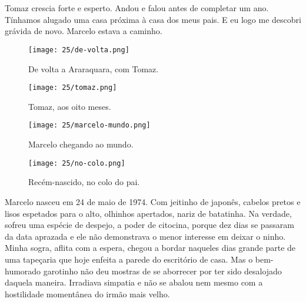 \chapter{}

Tomaz crescia forte e esperto.
Andou e falou antes de completar um ano.
Tínhamos alugado uma casa próxima à casa dos meus pais.
E eu logo me descobri grávida de novo.
Marcelo estava a caminho.
  

\begin{figure}
\centering
\texttt{[image: 25/de-volta.png]}
\caption{De volta a Araraquara, com Tomaz.}
\end{figure}

\begin{figure}
\centering
\texttt{[image: 25/tomaz.png]}
\caption{Tomaz, aos oito meses.}
\end{figure}

\begin{figure}
\centering
\texttt{[image: 25/marcelo-mundo.png]}
\caption{Marcelo chegando ao mundo.}
\end{figure}

\begin{figure}
\centering
\texttt{[image: 25/no-colo.png]}
\caption{Recém-nascido, no colo do pai.}
\end{figure}

Marcelo nasceu em 24 de maio de 1974.
Com jeitinho de japonês, cabelos pretos e lisos espetados para o alto, olhinhos apertados, nariz de batatinha.
Na verdade, sofreu uma espécie de despejo, a poder de citocina, porque dez dias se passaram da data aprazada e ele não demonstrava o menor interesse em deixar o ninho.
Minha sogra, aflita com a espera, chegou a bordar naqueles dias grande parte de uma tapeçaria que hoje enfeita a parede 
do escritório de casa.
Mas o bem-humorado garotinho não deu mostras de se aborrecer por ter sido desalojado daquela maneira.
Irradiava simpatia e não se abalou nem mesmo com a hostilidade momentânea do irmão mais velho.


